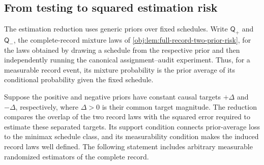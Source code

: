 \subsection{From testing to squared estimation risk}

The estimation reduction uses generic priors over fixed schedules. Write \(\mathsf Q_+\) and \(\mathsf Q_-\), the complete-record mixture laws of \cref{obj:lem:full-record-two-prior-risk}, for the laws obtained by drawing a schedule from the respective prior and then independently running the canonical assignment--audit experiment. Thus, for a measurable record event, its mixture probability is the prior average of its conditional probability given the fixed schedule.

Suppose the positive and negative priors have constant causal targets \(+\Delta\) and \(-\Delta\), respectively, where \(\Delta>0\) is their common target magnitude. The reduction compares the overlap of the two record laws with the squared error required to estimate these separated targets. Its support condition connects prior-average loss to the minimax schedule class, and its measurability condition makes the induced record laws well defined. The following statement includes arbitrary measurable randomized estimators of the complete record.

